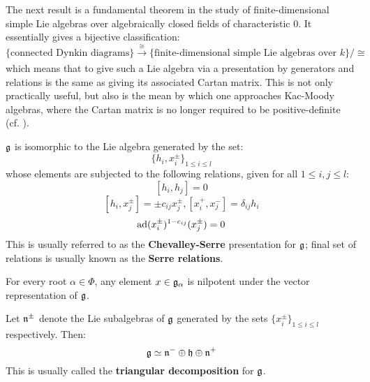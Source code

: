         The next result is a fundamental theorem in the study of finite-dimensional simple Lie algebras over algebraically closed fields of characteristic $0$. It essentially gives a bijective classification:
            $$\{ \text{connected Dynkin diagrams} \} \xrightarrow[]{\cong} \{ \text{finite-dimensional simple Lie algebras over $k$} \}/\cong$$
        which means that to give such a Lie algebra via a presentation by generators and relations is the same as giving its associated Cartan matrix. This is not only practically useful, but also is the mean by which one approaches Kac-Moody algebras, where the Cartan matrix is no longer required to be positive-definite (cf. \cite[Chapters 1-5]{kac_infinite_dimensional_lie_algebras}). 
        \begin{theorem}
            $\mathfrak{g}$ is isomorphic to the Lie algebra generated by the set:
                $$\{h_i, x_i^{\pm}\}_{1 \leq i \leq l}$$
            whose elements are subjected to the following relations, given for all $1 \leq i, j \leq l$:
                $$[h_i, h_j] = 0$$
                $$[h_i, x_j^{\pm}] = \pm c_{ij} x_j^{\pm}, [x_i^+, x_j^-] = \delta_{ij} h_i$$
                $$\mathrm{ad}(x_i^{\pm})^{1 - c_{ij}}(x_j^{\pm}) = 0$$
            This is usually referred to as the \textbf{Chevalley-Serre} presentation for $\mathfrak{g}$; final set of relations is usually known as the \textbf{Serre relations}.
        \end{theorem}
        \begin{corollary}
            For every root $\alpha \in \Phi$, any element $x \in \mathfrak{g}_{\alpha}$ is nilpotent under the vector representation of $\mathfrak{g}$. 
        \end{corollary}
        \begin{corollary}
            Let $\mathfrak{n}^{\pm}$ denote the Lie subalgebras of $\mathfrak{g}$ generated by the sets $\{x_i^{\pm}\}_{1 \leq i \leq l}$ respectively. Then:
                $$\mathfrak{g} \simeq \mathfrak{n}^- \oplus \mathfrak{h} \oplus \mathfrak{n}^+$$
            This is usually called the \textbf{triangular decomposition} for $\mathfrak{g}$. 
        \end{corollary}

